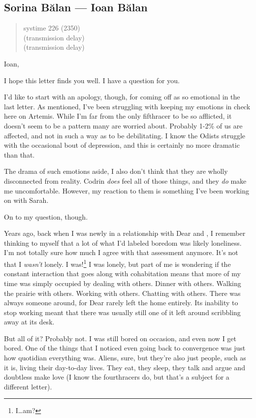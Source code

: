 \hypertarget{sorina-bux103lan-ioan-bux103lan}{%
\subsection{Sorina Bălan — Ioan Bălan}\label{sorina-bux103lan-ioan-bux103lan}}

\begin{quote}
systime 226 (2350)\\
(transmission delay)\\
(transmission delay)
\end{quote}

Ioan,

I hope this letter finds you well. I have a question for you.

I'd like to start with an apology, though, for coming off as so emotional in the last letter. As mentioned, I've been struggling with keeping my emotions in check here on Artemis. While I'm far from the only fifthracer to be so afflicted, it doesn't seem to be a pattern many are worried about. Probably 1-2\% of us are affected, and not in such a way as to be debilitating. I know the Odists struggle with the occasional bout of depression, and this is certainly no more dramatic than that.

The drama of such emotions aside, I also don't think that they are wholly disconnected from reality. Codrin \emph{does} feel all of those things, and they \emph{do} make me uncomfortable. However, my reaction to them is something I've been working on with Sarah.

On to my question, though.

Years ago, back when I was newly in a relationship with Dear and \Partner , I remember thinking to myself that a lot of what I'd labeled boredom was likely loneliness. I'm not totally sure how much I agree with that assessment anymore. It's not that I \emph{wasn't} lonely. I was!\footnote{I\ldots am?} I was lonely, but part of me is wondering if the constant interaction that goes along with cohabitation means that more of my time was simply occupied by dealing with others. Dinner with others. Walking the prairie with others. Working with others. Chatting with others. There was always someone around, for Dear rarely left the home entirely. Its inability to stop working meant that there was usually still one of it left around scribbling away at its desk.

But all of it? Probably not. I was still bored on occasion, and even now I get bored. One of the things that I noticed even going back to convergence was just how quotidian everything was. Aliens, sure, but they're also just people, such as it is, living their day-to-day lives. They eat, they sleep, they talk and argue and doubtless make love (I know the fourthracers do, but that's a subject for a different letter).

